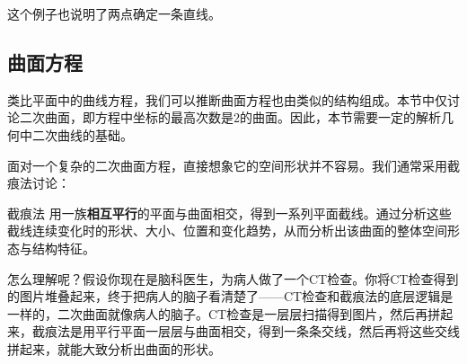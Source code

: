 这个例子也说明了两点确定一条直线。

\subsection{曲面方程}
类比平面中的曲线方程，我们可以推断曲面方程也由类似的结构组成。本节中仅讨论二次曲面，即方程中坐标的最高次数是$2$的曲面。因此，本节需要一定的解析几何中二次曲线的基础。

面对一个复杂的二次曲面方程，直接想象它的空间形状并不容易。我们通常采用截痕法讨论：

\begin{definition}{截痕法}{}
用一族\textbf{相互平行}的平面与曲面相交，得到一系列平面截线。通过分析这些截线连续变化时的形状、大小、位置和变化趋势，从而分析出该曲面的整体空间形态与结构特征。
\end{definition}

怎么理解呢？假设你现在是脑科医生，为病人做了一个CT检查。你将CT检查得到的图片堆叠起来，终于把病人的脑子看清楚了——CT检查和截痕法的底层逻辑是一样的，二次曲面就像病人的脑子。CT检查是一层层扫描得到图片，然后再拼起来，截痕法是用平行平面一层层与曲面相交，得到一条条交线，然后再将这些交线拼起来，就能大致分析出曲面的形状。

